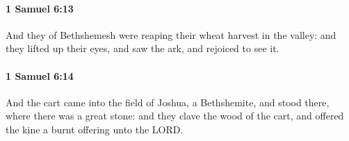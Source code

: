 		\paragraph{1 Samuel 6:13} %
			\label{1SAMUEL-6-13}

			And they of Bethshemesh were reaping their wheat harvest in the valley: and they lifted up their eyes, and saw the ark, and rejoiced to see it.


		\paragraph{1 Samuel 6:14} %
			\label{1SAMUEL-6-14}

			And the cart came into the field of Joshua, a Bethshemite, and stood there, where there was a great stone: and they clave the wood of the cart, and offered the kine a burnt offering unto the LORD.


